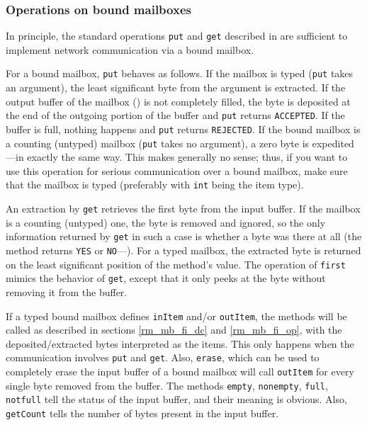 \subsubsection{Operations on bound mailboxes}
\label{rm_mb_bo_rw}

In principle, the standard operations {\tt put} and {\tt get}
described in  are sufficient to implement network
communication via a bound mailbox.

For a bound mailbox, {\tt put} behaves as follows.
If the mailbox is typed ({\tt put} takes an argument),
the least significant byte from the argument is extracted.
If the output buffer of the mailbox () is not completely
filled, the byte is deposited at the end of the outgoing portion
of the buffer and {\tt put} returns {\tt ACCEPTED}.
If the buffer is full, nothing happens and {\tt put} returns
{\tt REJECTED}.
If the bound mailbox is a counting (untyped) mailbox ({\tt put} takes
no argument), a zero byte is expedited---in exactly the same way.
This makes generally no sense; thus, if you want to use this operation
for serious communication over a bound mailbox, make sure that the mailbox
is typed (preferably with {\tt int} being the item type).

An extraction by {\tt get} retrieves the first byte from the input buffer.
If the mailbox is a counting (untyped) one, the byte is removed and
ignored, so the only information returned by {\tt get} in such a case
is whether a byte was there at all (the method returns {\tt YES} or
{\tt NO}---).
For a typed mailbox, the extracted byte is returned on the least significant
position of the method's value.
The operation of {\tt first} mimics the behavior of {\tt get}, except that
it only peeks at the byte without removing it from the buffer.

If a typed bound mailbox defines {\tt inItem} and/or {\tt outItem},
the methods will be called as described in sections
\ref{rm_mb_fi_dc} and \ref{rm_mb_fi_op}, with the deposited/extracted bytes
interpreted as the items.
This only happens when the communication involves {\tt put} and {\tt get}.
Also, {\tt erase}, which can be used to completely erase the input buffer
of a bound mailbox will call {\tt outItem} for every single byte removed
from the buffer.
The methods {\tt empty}, {\tt nonempty}, {\tt full}, {\tt notfull} tell the
status of the input buffer, and their meaning is obvious.
Also, {\tt getCount} tells the number of bytes present in the input buffer.

